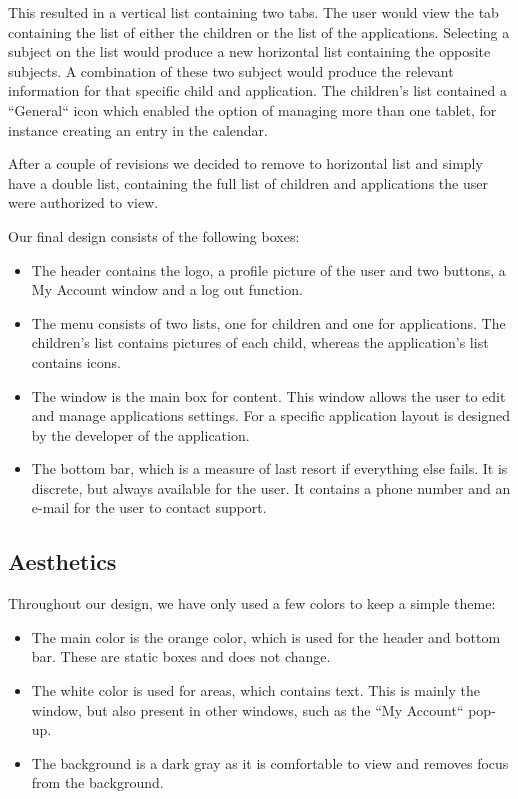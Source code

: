 
This resulted in a vertical list containing two tabs. The user would view the tab containing the list of either the children or the list of the applications. Selecting a subject on the list would produce a new horizontal list containing the opposite subjects. A combination of these two subject would produce the relevant information for that specific child and application.
The children's list contained a ``General`` icon which enabled the option of managing more than one tablet, for instance creating an entry in the calendar. 


After a couple of revisions we decided to remove to horizontal list and simply have a double list, containing the full list of children and applications the user were authorized to view. 


Our final design consists of the following boxes:
\begin{itemize}
 \item The header contains the logo, a profile picture of the user and two buttons, a My Account window and a log out function.
 \item The menu consists of two lists, one for children and one for applications. The children's list contains pictures of each child, whereas the application's list contains icons. 
 \item The window is the main box for content. This window allows the user to edit and manage applications settings. For a specific application layout is designed by the developer of the application.
 \item The bottom bar, which is a measure of last resort if everything else fails. It is discrete, but always available for the user. It contains a phone number and an e-mail for the user to contact support.
\end{itemize}


\subsection{Aesthetics}
Throughout our design, we have only used a few colors to keep a simple theme:
\begin{itemize}
 \item The main color is the orange color, which is used for the header and bottom bar. These are static boxes and does not change.
 \item The white color is used for areas, which contains text. This is mainly the window, but also present in other windows, such as the ``My Account`` pop-up.
 \item The background is a dark gray as it is comfortable to view and removes focus from the background. 
\end{itemize}


